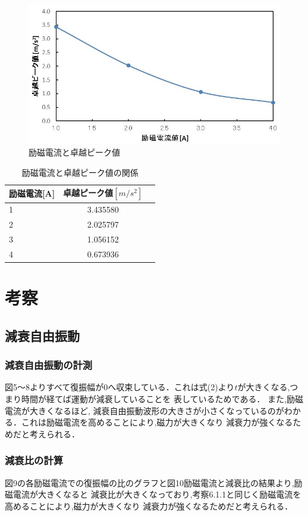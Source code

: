 \documentclass[a4paper,10.5pt]{jsarticle}
\begin{document}
\begin{figure}[h]
  \centering
  \includegraphics[width=14cm]{11.png}
  \caption{励磁電流と卓越ピーク値}
\end{figure}
\newpage
\begin{table}[h]
  \centering
  \caption{励磁電流と卓越ピーク値の関係}
  \begin{tabular}{l|c|r}
    励磁電流[A]&卓越ピーク値$[m/s^2]$\\\hline\hline
      1&3.435580 \\ \hline
      2&2.025797  \\
      3&1.056152  \\
      4&0.673936  \\\hline
  \end{tabular}
\end{table}

\section{考察}
\subsection{減衰自由振動}
\subsubsection{減衰自由振動の計測}
図5〜8よりすべて復振幅が0へ収束している．これは式(2)より$t$が大きくなる,つまり時間が経てば運動が減衰していることを
表しているためである．
また,励磁電流が大きくなるほど,
減衰自由振動波形の大きさが小さくなっているのがわかる．これは励磁電流を高めることにより,磁力が大きくなり
減衰力が強くなるためだと考えられる．
\subsubsection{減衰比の計算}
図9の各励磁電流での復振幅の比のグラフと図10励磁電流と減衰比の結果より,励磁電流が大きくなると
減衰比が大きくなっており,考察6.1.1と同じく励磁電流を高めることにより,磁力が大きくなり
減衰力が強くなるためだと考えられる．
\end{document}
